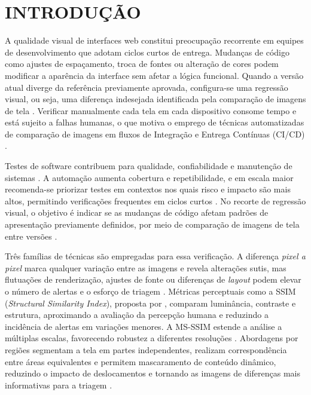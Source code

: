 \documentclass{UNESC}
\begin{document}
\section{INTRODUÇÃO}

A qualidade visual de interfaces web constitui preocupação recorrente em equipes de desenvolvimento que adotam ciclos curtos de entrega. Mudanças de código como ajustes de espaçamento, troca de fontes ou alteração de cores podem modificar a aparência da interface sem afetar a lógica funcional. Quando a versão atual diverge da referência previamente aprovada, configura-se uma regressão visual, ou seja, uma diferença indesejada identificada pela comparação de imagens de tela \cite{tanno2020}. Verificar manualmente cada tela em cada dispositivo consome tempo e está sujeito a falhas humanas, o que motiva o emprego de técnicas automatizadas de comparação de imagens em fluxos de Integração e Entrega Contínuas (CI/CD) \cite{shahin2017,hilton2016ci}.

Testes de software contribuem para qualidade, confiabilidade e manutenção de sistemas \cite{alberto2020,banerjee2013}. A automação aumenta cobertura e repetibilidade, e em escala maior recomenda-se priorizar testes em contextos nos quais risco e impacto são mais altos, permitindo verificações frequentes em ciclos curtos \cite{costa2022}. No recorte de regressão visual, o objetivo é indicar se as mudanças de código afetam padrões de apresentação previamente definidos, por meio de comparação de imagens de tela entre versões \cite{tanno2020,figueiredo2018,bordignon2019,tanoue2018vrt}.

Três famílias de técnicas são empregadas para essa verificação. A diferença \emph{pixel a pixel} marca qualquer variação entre as imagens e revela alterações sutis, mas flutuações de renderização, ajustes de fonte ou diferenças de \emph{layout} podem elevar o número de alertas e o esforço de triagem \cite{tanno2020,figueiredo2018,tanoue2018vrt}. Métricas perceptuais como a SSIM (\emph{Structural Similarity Index}), proposta por , comparam luminância, contraste e estrutura, aproximando a avaliação da percepção humana e reduzindo a incidência de alertas em variações menores. A MS-SSIM estende a análise a múltiplas escalas, favorecendo robustez a diferentes resoluções \cite{wang2003msssim}. Abordagens por regiões segmentam a tela em partes independentes, realizam correspondência entre áreas equivalentes e permitem mascaramento de conteúdo dinâmico, reduzindo o impacto de deslocamentos e tornando as imagens de diferenças mais informativas para a triagem \cite{tanno2020}.
\end{document}
